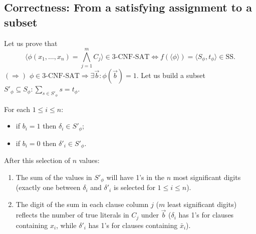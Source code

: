 \subsection{Correctness: From a satisfying assignment to a subset}
Let us prove that
\[
\langle\phi(x_1,\ldots,x_n)=\bigwedge_{j=1}^m C_j\rangle\in\mathrm{3\text{-}CNF\text{-}SAT}
\Longleftrightarrow f(\langle\phi\rangle)=\langle S_\phi,t_\phi\rangle\in\mathrm{SS}.
\]
$(\Rightarrow)$ $\phi\in\mathrm{3\text{-}CNF\text{-}SAT}\Rightarrow\exists\vec b:\phi(\vec b)=1$.
Let us build a subset $S'_\phi\subseteq S_\phi:\sum_{s\in S'_\phi}s=t_\phi$.

For each $1\leq i\leq n$:
\begin{itemize}
\item if $b_i=1$ then $\delta_i\in S'_\phi$;
\item if $b_i=0$ then $\delta'_i\in S'_\phi$.
\end{itemize}
After this selection of $n$ values:
\begin{enumerate}
\item The sum of the values in $S'_\phi$ will have 1's in the $n$ most significant digits (exactly one between $\delta_i$ and $\delta'_i$ is selected for $1\leq i\leq n$).
\item The digit of the sum in each clause column $j$ ($m$ least significant digits) reflects the number of true literals in $C_j$ under $\vec b$ ($\delta_i$ has 1's for clauses containing $x_i$, while $\delta'_i$ has 1's for clauses containing $\bar x_i$).
\end{enumerate}
